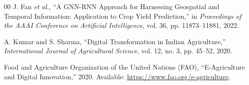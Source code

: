 \documentclass[conference]{IEEEtran}
\begin{document}
\begin{thebibliography}{00}
 J. Fan \emph{et al.}, ``A GNN-RNN Approach for Harnessing Geospatial and Temporal Information: Application to Crop Yield Prediction,'' in \emph{Proceedings of the AAAI Conference on Artificial Intelligence}, vol. 36, pp. 11873--11881, 2022.

 A. Kumar and S. Sharma, ``Digital Transformation in Indian Agriculture,'' \emph{International Journal of Agricultural Science}, vol. 12, no. 3, pp. 45--52, 2020.

 Food and Agriculture Organization of the United Nations (FAO), ``E-Agriculture and Digital Innovation,'' 2020. Available: \url{https://www.fao.org/e-agriculture}.
\end{thebibliography}
\end{document}
